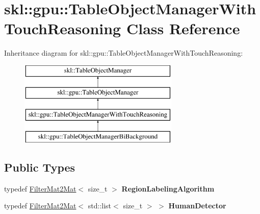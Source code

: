 \hypertarget{classskl_1_1gpu_1_1_table_object_manager_with_touch_reasoning}{}\section{skl\+:\+:gpu\+:\+:Table\+Object\+Manager\+With\+Touch\+Reasoning Class Reference}
\label{classskl_1_1gpu_1_1_table_object_manager_with_touch_reasoning}
Inheritance diagram for skl\+:\+:gpu\+:\+:Table\+Object\+Manager\+With\+Touch\+Reasoning\+:\begin{figure}[H]
\begin{center}
\leavevmode
\includegraphics[height=4.000000cm]{classskl_1_1gpu_1_1_table_object_manager_with_touch_reasoning}
\end{center}
\end{figure}
\subsection*{Public Types}
\begin{DoxyCompactItemize}
\item 
\hypertarget{classskl_1_1gpu_1_1_table_object_manager_with_touch_reasoning_ad3124bcae3baed4b2e1da0f154e2d1d8}{}\label{classskl_1_1gpu_1_1_table_object_manager_with_touch_reasoning_ad3124bcae3baed4b2e1da0f154e2d1d8} 
typedef \hyperlink{classskl_1_1_filter_mat2_mat}{Filter\+Mat2\+Mat}$<$ size\+\_\+t $>$ {\bfseries Region\+Labeling\+Algorithm}
\item 
\hypertarget{classskl_1_1gpu_1_1_table_object_manager_with_touch_reasoning_a542b635e1260a1a1043c94aefffd2465}{}\label{classskl_1_1gpu_1_1_table_object_manager_with_touch_reasoning_a542b635e1260a1a1043c94aefffd2465} 
typedef \hyperlink{classskl_1_1_filter_mat2_mat}{Filter\+Mat2\+Mat}$<$ std\+::list$<$ size\+\_\+t $>$ $>$ {\bfseries Human\+Detector}
\end{DoxyCompactItemize}
